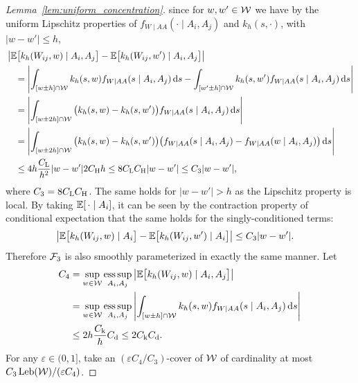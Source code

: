 \begin{proof}[Lemma~\ref{lem:uniform_concentration}]
  since for $w,w' \in \mathcal{W}$ we have
  by the uniform Lipschitz properties of
  $f_{W \mid AA}(\cdot \mid A_i, A_j)$ and
  $k_h(s, \cdot)$,
  with $|w-w'| \leq h$,
  \begin{align*}
    &\left|
    \mathbb{E}\big[ k_h(W_{i j},w) \mid A_i, A_j \big]
    - \mathbb{E}\big[ k_h(W_{i j},w') \mid A_i, A_j \big]
    \right| \\
    &\quad=
    \left|
    \int_{[w \pm h] \cap \mathcal{W}}
    k_h(s,w)
    f_{W \mid AA}(s \mid A_i, A_j)
    \,\mathrm{d}s
    - \int_{[w' \pm h] \cap \mathcal{W}}
    k_h(s,w')
    f_{W \mid AA}(s \mid A_i, A_j)
    \,\mathrm{d}s
    \right| \\
    &\quad=
    \left|
    \int_{[w \pm 2h] \cap \mathcal{W}}
    \big(
      k_h(s,w)
      - k_h(s,w')
    \big)
    f_{W \mid AA}(s \mid A_i, A_j)
    \,\mathrm{d}s
    \right| \\
    &\quad=
    \left|
    \int_{[w \pm 2h] \cap \mathcal{W}}
    \big(
      k_h(s,w)
      - k_h(s,w')
    \big)
    \big(
      f_{W \mid AA}(s \mid A_i, A_j)
      - f_{W \mid AA}(w \mid A_i, A_j)
    \big)
    \,\mathrm{d}s
    \right| \\
    &\quad\leq
    4h
    \frac{C_\mathrm{L}}{h^2}
    |w-w'|
    2 C_\mathrm{H} h
    \leq
    8 C_\mathrm{L} C_\mathrm{H}
    |w-w'|
    \leq
    C_3
    |w-w'|,
  \end{align*}
  where $C_3 = 8 C_\mathrm{L} C_\mathrm{H}$.
  The same holds for $|w-w'| > h$
  as the Lipschitz property is local.
  By taking $\mathbb{E}[\, \cdot \mid A_i]$,
  it can be seen
  by the contraction property of conditional expectation that
  the same holds for the
  singly-conditioned terms:
  \begin{align*}
    \left|
    \mathbb{E}\big[ k_h(W_{i j},w) \mid A_i \big]
    - \mathbb{E}\big[ k_h(W_{i j},w') \mid A_i \big]
    \right|
    &\leq
    C_3
    |w-w'|.
  \end{align*}
  Therefore $\mathcal{F}_3$ is also smoothly parameterized
  in exactly the same manner.
  Let
  \begin{align*}
    C_4
    &=
    \sup_{w \in \mathcal{W}}
    \operatorname*{ess\,sup}_{A_i, A_j}
    \big|
    \mathbb{E}\big[ k_h(W_{i j},w) \mid A_i, A_j \big]
    \big| \\
    &=
    \sup_{w \in \mathcal{W}}
    \operatorname*{ess\,sup}_{A_i, A_j}
    \left|
    \int_{[w \pm h] \cap \mathcal{W}}
    k_h(s,w)
    f_{W \mid AA}(s \mid A_i, A_j)
    \,\mathrm{d}s
    \right| \\
    &\leq 2h \frac{C_\mathrm{k}}{h} C_\mathrm{d}
    \leq 2 C_\mathrm{k} C_\mathrm{d}.
  \end{align*}
  For any $\varepsilon \in (0,1]$,
  take an $(\varepsilon C_4/C_3)$-cover of $\mathcal{W}$
  of cardinality at most $C_3 \operatorname{Leb}(\mathcal{W}) / (\varepsilon C_4)$.

\end{proof}
